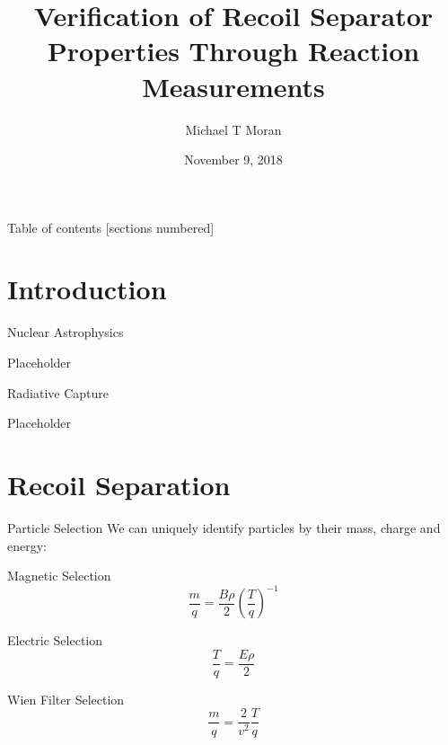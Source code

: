 \documentclass[10pt]{beamer}
\title{Verification of Recoil Separator Properties Through Reaction Measurements}
\subtitle{}
\date{November 9, 2018}
\author{Michael T Moran}
\institute{University of Notre Dame}
\begin{document}
\maketitle

\begin{frame}{Table of contents}
  [sections numbered]
  \tableofcontents[hideallsubsections]
\end{frame}

\section{Introduction}

\begin{frame}[fragile]{Nuclear Astrophysics}

    Placeholder

\end{frame}

\begin{frame}[fragile]{Radiative Capture}

    Placeholder

\end{frame}

\section{Recoil Separation}

\begin{frame}{Particle Selection}
    We can uniquely identify particles by their mass, charge and energy:

    \begin{alertblock}{Magnetic Selection}
        \[
            \frac{m}{q} = \frac{B\rho}{2}\left(\frac{T}{q}\right)^{-1}
        \]
    \end{alertblock}
    \begin{alertblock}{Electric Selection}
        \[
            \frac{T}{q} = \frac{E\rho}{2}
        \]
    \end{alertblock}
    \begin{alertblock}{Wien Filter Selection}
        \[
            \frac{m}{q} = \frac{2}{v^2} \frac{T}{q}
        \]
    \end{alertblock}

\end{frame}
\end{document}
